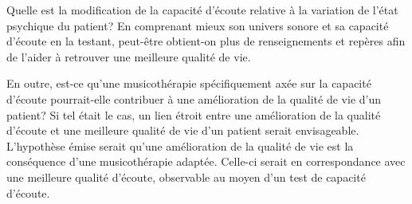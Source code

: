    Quelle est la modification de la capacité d'écoute relative à la variation de l'état psychique du patient?
   En comprenant mieux son univers sonore et sa capacité 
  d'écoute en la testant, peut-être obtient-on plus de renseignements et repères afin de l'aider à 
  retrouver  une 
  meilleure qualité de vie.

 En outre, est-ce qu'une musicothérapie spécifiquement axée sur la capacité d'écoute pourrait-elle  
 contribuer à une 
amélioration de la qualité de vie d'un patient? 
Si tel était  le cas, un lien étroit entre une amélioration de la 
qualité d'écoute  et une meilleure qualité de vie  d'un patient serait envisageable.
L'hypothèse émise serait qu'une amélioration de la qualité de vie est la conséquence d'une 
musicothérapie 
adaptée. Celle-ci serait en correspondance avec une 
meilleure qualité d'écoute, observable au moyen d'un test de capacité d'écoute.


